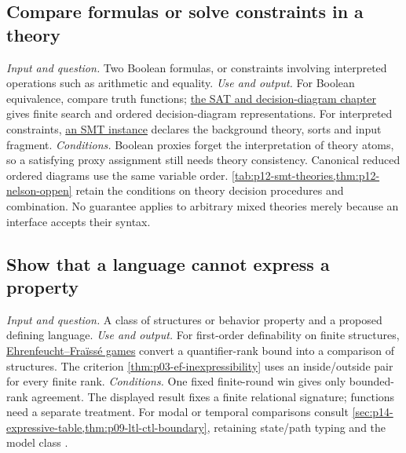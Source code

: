 \subsection{Compare formulas or solve constraints in a theory}
\label{sec:p14-finder-equivalence-smt}
\textit{Input and question.} Two Boolean formulas, or constraints involving
interpreted operations such as arithmetic and equality.
\textit{Use and output.} For Boolean equivalence, compare truth functions;
\hyperref[sec:p12-sat-and-certificates]{the SAT and decision-diagram chapter}
gives finite search and ordered decision-diagram representations. For
interpreted constraints, \hyperref[def:p12-smt-problem]{an SMT instance}
declares the background theory, sorts and input fragment.
\textit{Conditions.} Boolean proxies forget the interpretation of theory
atoms, so a satisfying proxy assignment still needs theory consistency.
Canonical reduced ordered diagrams use the same variable order.
\cref{tab:p12-smt-theories,thm:p12-nelson-oppen} retain the conditions
on theory decision procedures and combination. No guarantee applies to
arbitrary mixed theories merely because an interface accepts their syntax.

\subsection{Show that a language cannot express a property}
\label{sec:p14-finder-expressibility}
\textit{Input and question.} A class of structures or behavior property and
a proposed defining language.
\textit{Use and output.} For first-order definability on finite structures,
\hyperref[sec:p03-ef-games]{Ehrenfeucht--Fra\"iss\'e games} convert a
quantifier-rank bound into a comparison of structures. The criterion
\cref{thm:p03-ef-inexpressibility} uses an inside/outside pair for every
finite rank.
\textit{Conditions.} One fixed finite-round win gives only bounded-rank
agreement. The displayed result fixes a finite relational signature; functions
need a separate treatment. For modal or temporal comparisons consult
\cref{sec:p14-expressive-table,thm:p09-ltl-ctl-boundary}, retaining state/path
typing and the model class
\cite{Ehrenfeucht1961,Libkin2004,EmersonHalpern1986}.

